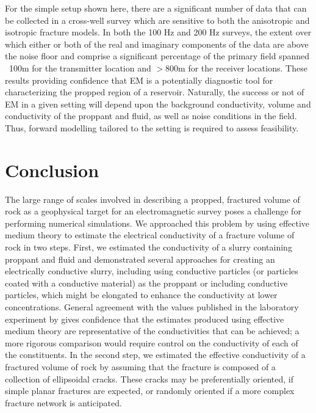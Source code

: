 

For the simple setup shown here, there are a significant number of data that can be collected in a cross-well survey which are sensitive to both the anisotropic and isotropic fracture models. In both the 100 Hz and 200 Hz surveys, the extent over which either or both of the real and imaginary components of the data are above the noise floor and comprise a significant percentage of the primary field spanned ~100m for the transmitter location and $> 800$m for the receiver locations. These results providing confidence that EM is a potentially diagnostic tool for characterizing the propped region of a reservoir. Naturally, the success or not of EM in a given setting will depend upon the background conductivity, volume and conductivity of the proppant and fluid, as well as noise conditions in the field. Thus, forward modelling tailored to the setting is required to assess feasibility.
\section{Conclusion}

The large range of scales involved in describing a propped, fractured volume of rock as a geophysical target for an electromagnetic survey poses a challenge for performing numerical simulations. We approached this problem by using effective medium theory to estimate the electrical conductivity of a fracture volume of rock in two steps. First, we estimated the conductivity of a slurry containing proppant and fluid and demonstrated several approaches for creating an electrically conductive slurry, including using conductive particles (or particles coated with a conductive material) as the proppant or including conductive particles, which might be elongated to enhance the conductivity at lower concentrations. General agreement with the values published in the laboratory experiment by \cite{Zhang2016} gives confidence that the estimates produced using effective medium theory are representative of the conductivities that can be achieved; a more rigorous comparison would require control on the conductivity of each of the constituents. In the second step, we estimated the effective conductivity of a fractured volume of rock by assuming that the fracture is composed of a collection of ellipsoidal cracks. These cracks may be preferentially oriented, if simple planar fractures are expected, or randomly oriented if a more complex fracture network is anticipated.

